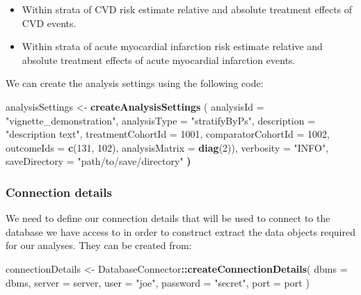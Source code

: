 \documentclass[]{article}
\newenvironment{Shaded}{\begin{snugshade}}{\end{snugshade}}
\newcommand{\DataTypeTok}[1]{\textcolor[rgb]{0.13,0.29,0.53}{#1}}
\newcommand{\DecValTok}[1]{\textcolor[rgb]{0.00,0.00,0.81}{#1}}
\newcommand{\ErrorTok}[1]{\textcolor[rgb]{0.64,0.00,0.00}{\textbf{#1}}}
\newcommand{\KeywordTok}[1]{\textcolor[rgb]{0.13,0.29,0.53}{\textbf{#1}}}
\newcommand{\NormalTok}[1]{#1}
\newcommand{\OperatorTok}[1]{\textcolor[rgb]{0.81,0.36,0.00}{\textbf{#1}}}
\newcommand{\StringTok}[1]{\textcolor[rgb]{0.31,0.60,0.02}{#1}}
\providecommand{\tightlist}{%
  \setlength{\itemsep}{0pt}\setlength{\parskip}{0pt}}
\begin{document}
\begin{itemize}
\tightlist
\item
  Within strata of CVD risk estimate relative and absolute treatment
  effects of CVD events.
\item
  Within strata of acute myocardial infarction risk estimate relative
  and absolute treatment effects of acute myocardial infarction events.
\end{itemize}

We can create the analysis settings using the following code:

\begin{Shaded}
\begin{Highlighting}[]
\NormalTok{analysisSettings <{-}}\StringTok{ }\KeywordTok{createAnalysisSettings}\NormalTok{ (}
  \DataTypeTok{analysisId =} \StringTok{"vignette\_demonstration"}\NormalTok{,}
  \DataTypeTok{analysisType =} \StringTok{"stratifyByPs"}\NormalTok{,}
  \DataTypeTok{description =} \StringTok{"description text"}\NormalTok{,}
  \DataTypeTok{treatmentCohortId =} \DecValTok{1001}\NormalTok{,}
  \DataTypeTok{comparatorCohortId =} \DecValTok{1002}\NormalTok{,}
  \DataTypeTok{outcomeIds =} \KeywordTok{c}\NormalTok{(}\DecValTok{131}\NormalTok{, }\DecValTok{102}\NormalTok{),}
  \DataTypeTok{analysisMatrix =} \KeywordTok{diag}\NormalTok{(}\DecValTok{2}\NormalTok{)),}
\NormalTok{verbosity =}\StringTok{ "INFO"}\NormalTok{,}
\NormalTok{saveDirectory =}\StringTok{ "path/to/save/directory"}
\ErrorTok{)}
\end{Highlighting}
\end{Shaded}

\hypertarget{connection-details}{%
\subsubsection{Connection details}\label{connection-details}}

We need to define our connection details that will be used to connect to
the database we have access to in order to construct extract the data
objects required for our analyses. They can be created from:

\begin{Shaded}
\begin{Highlighting}[]
\NormalTok{connectionDetails <{-}}\StringTok{ }\NormalTok{DatabaseConnector}\OperatorTok{::}\KeywordTok{createConnectionDetails}\NormalTok{(}
  \DataTypeTok{dbms =}\NormalTok{ dbms,}
  \DataTypeTok{server =}\NormalTok{ server,}
  \DataTypeTok{user =} \StringTok{"joe"}\NormalTok{,}
  \DataTypeTok{password =} \StringTok{"secret"}\NormalTok{,}
  \DataTypeTok{port =}\NormalTok{ port}
\NormalTok{)}
\end{Highlighting}
\end{Shaded}
\end{document}
